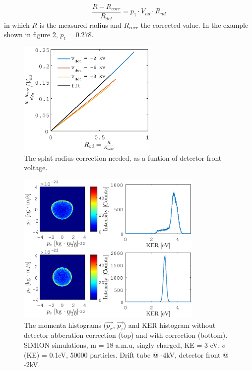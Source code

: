 \begin{equation}
\frac{R - R_{corr}}{R_{det}} =  p_1 \cdot V_{nd} \cdot R_{nd}
\end{equation}
in which $R$ is the measured radius and $R_{corr}$ the corrected value. In the example shown in figure \ref{Radius_correction_det_abb}, $p_1 = 0.278$.


\begin{figure}[h]
   \centering
    \centerline{\includegraphics[width=0.6\textwidth]{Graphics/Radius_correction_det_abb.eps}}
\caption{The splat radius correction needed, as a funtion of detector front voltage.}
\label{Radius_correction_det_abb}
\end{figure}

\begin{figure}[h]
   \centering
    \centerline{\includegraphics[width=0.8\textwidth]{Graphics/SIMION_det_corr_both.eps}}
\caption{The momenta histograms ($\vec{p_x}$, $\vec{p_z}$) and KER histogram without detector abberation correction (top) and with correction (bottom). SIMION simulations, m = 18 a.m.u, singly charged, KE = 3 eV, $\sigma$(KE) = 0.1eV, 50000 particles. Drift tube @ -4kV, detector front @ -2kV.}
\label{Radius_correction_det_abb}
\end{figure}


